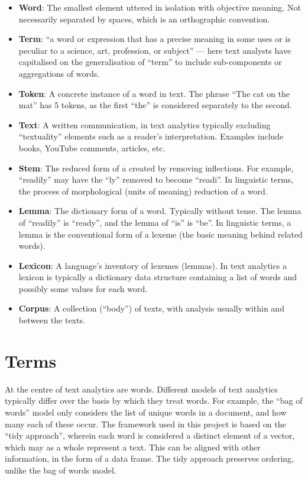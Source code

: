 \documentclass[11pt, a4paper, twoside, titlepage]{report}
\begin{document}
\begin{itemize}
\item \textbf{\gls{Word}}: The smallest element uttered in isolation with
  objective meaning. Not necessarily separated by spaces, which is an
  orthographic convention.
\item \textbf{\gls{Term}}: ``a word or expression that has a precise
  meaning in some uses or is peculiar to a science, art, profession,
  or subject'' \autocite{dictionary:_term_defin_term} --- here text
  analysts have capitalised on the generalisation of ``term'' to
  include sub-components or aggregations of words.
\item \textbf{\gls{Token}}: A concrete instance of a word in text. The
  phrase ``The cat on the mat'' has 5 tokens, as the first ``the'' is
  considered separately to the second.
\item \textbf{\gls{Text}}: A written communication, in text
  analytics typically excluding ``textuality'' elements such as a reader's
  interpretation. Examples include books, YouTube comments, articles,
  etc.
\item \textbf{\gls{Stem}}: The reduced form of a created by removing
  inflections. For example, ``readily'' may have the ``ly'' removed to
  become ``readi''. In linguistic terms, the process of morphological
  (units of meaning) reduction of a word.
\item \textbf{\gls{Lemma}}: The dictionary form of a word. Typically
  without tense. The lemma of ``readily'' is ``ready'', and the lemma
  of ``is'' is ``be''. In linguistic terms, a lemma is the
  conventional form of a lexeme (the basic meaning behind related
  words).
\item \textbf{\gls{Lexicon}}: A language's inventory of lexemes
  (lemmas). In text analytics a lexicon is typically a
  dictionary data structure containing a list of words and possibly
  some values for each word.
\item \textbf{\gls{Corpus}}: A collection (``body'') of texts, with
  analysis usually within and between the texts.
\end{itemize}

\section{Terms}

At the centre of text analytics are words. Different models of text
analytics typically differ over the basis by which they treat words.
For example, the ``bag of words'' model only considers the list of
unique words in a document, and how many each of these occur. The
framework used in this project is based on the ``tidy approach'',
wherein each word is considered a distinct element of a vector, which
may as a whole represent a text. This can be aligned with other
information, in the form of a data frame. The tidy approach preserves
ordering, unlike the bag of words model.
\end{document}
